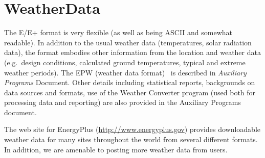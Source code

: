 \section{WeatherData}\label{weatherdata}

The E/E+ format is very flexible (as well as being ASCII and somewhat readable). In addition to the usual weather data (temperatures, solar radiation data), the format embodies other information from the location and weather data (e.g.~design conditions, calculated ground temperatures, typical and extreme weather periods). The EPW (weather data format)~ is described in \emph{Auxiliary Programs} Document. Other details including statistical reports, backgrounds on data sources and formats, use of the Weather Converter program (used both for processing data and reporting) are also provided in the Auxiliary Programs document.

The web site for EnergyPlus (\url{http://www.energyplus.gov}) provides downloadable weather data for many sites throughout the world from several different formats. In addition, we are amenable to posting more weather data from users.
